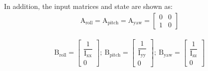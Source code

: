 \documentclass[3p,times]{elsarticle}
\begin{document}
In addition, the input matrices and state are shown as:
\begin{equation}
	\begin{split}
		\boldsymbol{\mathrm{A}}_{\text{roll}}  =\boldsymbol{\mathrm{A}}_{\text{pitch}}  = \boldsymbol{\mathrm{A}}_{\text{yaw}}  = \begin{bmatrix}
			0 & 0\\
			1 & 0
		\end{bmatrix}
	\end{split}
\end{equation}

\begin{equation}
	\begin{split}
		\boldsymbol{\mathrm{B}}_{\text{roll}}  = \begin{bmatrix}
			\dfrac{1}{\mathrm{I}_{\text{xx}}}
			\\[1em]
			0
		\end{bmatrix};~ \boldsymbol{\mathrm{B}}_{\text{pitch}}  = \begin{bmatrix}
			\dfrac{1}{\mathrm{I}_{\text{yy}}}
			\\[1em]
			0
		\end{bmatrix};~ \boldsymbol{\mathrm{B}}_{\text{yaw}}  = \begin{bmatrix}
			\dfrac{1}{\mathrm{I}_{\text{zz}}}
			\\[1em]
			0
		\end{bmatrix}
	\end{split}
\end{equation}
\end{document}
